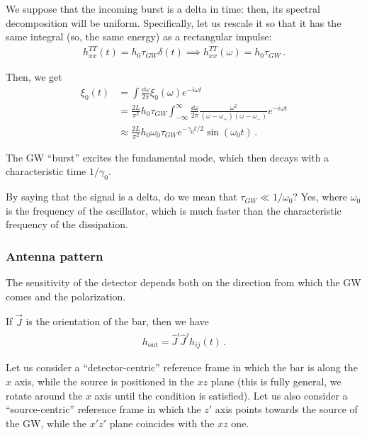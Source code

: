 \documentclass[main.tex]{subfiles}
\begin{document}

We suppose that the incoming burst is a delta in time: then, its spectral decomposition will be uniform.
Specifically, let us rescale it so that it has the same integral (so, the same energy) as a rectangular impulse: 
%
\begin{align}
h_{xx }^{TT} (t) = h_0 \tau_{GW} \delta (t) \implies h_{xx}^{TT} (\omega ) = h_0 \tau_{GW}
\,.
\end{align}

Then, we get 
%
\begin{align}
\xi_0 (t) &= \int \frac{ \dd{\omega }}{2 \pi } \xi_0 (\omega ) e^{-i \omega t}
\\
&= \frac{2L}{\pi^2} h_0 \tau_{GW} \int_{- \infty }^{ \infty } \frac{ \dd{\omega }}{2 \pi } \frac{\omega^2}{(\omega - \omega_{+}) (\omega-\omega_{-})} e^{-i \omega t}  \\
&\approx \frac{2L }{\pi^2} h_0 \omega_0 \tau_{GW} e^{-\gamma_0 t / 2} \sin(\omega_0 t)
\,.
\end{align}


The GW ``burst'' excites the fundamental mode, which then decays with a characteristic time \(1/ \gamma_0 \). 

By saying that the signal is a delta, do we mean that \(\tau_{GW} \ll 1 / \omega_0 \)?
Yes, where \(\omega_0 \) is the frequency of the oscillator, which is much faster than the characteristic frequency of the dissipation. 

\subsubsection{Antenna pattern}

The sensitivity of the detector depends both on the direction from which the GW comes and the polarization.

If \(\vec{J}\) is the orientation of the bar, then we have 
%
\begin{align}
h _{\text{out}} = \hat{J}^{i} \hat{J}^{j} h_{ij} (t)
\,.
\end{align}

Let us consider a ``detector-centric'' reference frame in which the bar is along the \(x\) axis, while the source is positioned in the \(xz\) plane (this is fully general, we rotate around the \(x\) axis until the condition is satisfied).
Let us also consider a ``source-centric'' reference frame in which the \(z'\) axis points towards the source of the GW, while the \(x' z'\) plane coincides with the \(xz\) one.
\end{document}
